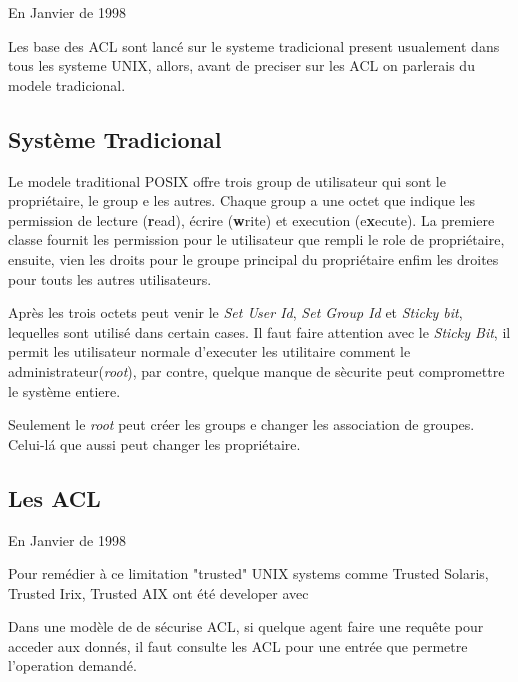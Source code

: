 \documentclass[draft]{article}
\begin{document}
En Janvier de 1998\cite{aclsuse} 

Les base des ACL sont lancé sur le systeme tradicional present usualement dans tous les systeme UNIX, allors, avant de preciser sur les ACL on parlerais du modele tradicional.

\subsection*{Système Tradicional}

Le modele traditional POSIX offre trois group de utilisateur qui sont le propriétaire, le group e les autres. Chaque group a une octet que indique les permission de lecture (\textbf{r}ead), écrire (\textbf{w}rite) et execution (e\textbf{x}ecute). La premiere classe fournit les permission pour le utilisateur que rempli le role de propriétaire, ensuite, vien les droits pour le groupe principal du propriétaire enfim les droites pour touts les autres utilisateurs. 
 
Après les trois octets peut venir le \emph{Set User Id}, \emph{Set Group Id} et \emph{Sticky bit}, lequelles sont utilisé dans certain cases. Il faut faire attention avec le \emph{Sticky Bit}, il permit les utilisateur normale d'executer les utilitaire comment le administrateur(\emph{root}), par contre, quelque manque de sècurite peut compromettre le système entiere.

Seulement le \emph{root} peut créer les groups e changer les association de groupes. Celui-lá que aussi peut changer les propriétaire.  

\subsection*{Les ACL}




En Janvier de 1998\cite{aclsuse}

Pour remédier à ce limitation "trusted" UNIX systems comme Trusted Solaris, Trusted Irix, Trusted AIX ont été developer avec 

Dans une modèle de de sécurise ACL, si quelque agent faire une requête pour acceder aux donnés, il faut consulte les ACL pour une entrée que permetre l'operation demandé.    
\end{document}
